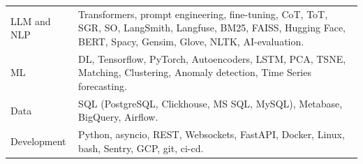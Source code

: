 \documentclass[a4paper,12pt]{article}
\begin{document}
{\footnotesize
\setlength{\tabcolsep}{1pt}
\renewcommand{\arraystretch}{1.0}
\begin{tabularx}{\linewidth}{@{}l X@{}}
LLM and NLP & Transformers, prompt engineering, fine-tuning, CoT, ToT, SGR, SO, LangSmith, Langfuse, BM25, FAISS, Hugging Face, BERT, Spacy, Gensim, Glove, NLTK, AI-evaluation.\\
ML & DL, Tensorflow, PyTorch, Autoencoders, LSTM, PCA, TSNE, Matching, Clustering, Anomaly detection, Time Series forecasting.\\
Data & SQL (PostgreSQL, Clickhouse, MS SQL, MySQL), Metabase, BigQuery, Airflow.\\
Development & Python, asyncio, REST, Websockets, FastAPI, Docker, Linux, bash, Sentry, GCP, git, ci-cd.\\
\end{tabularx}
}


\vfill
{}
\end{document}
